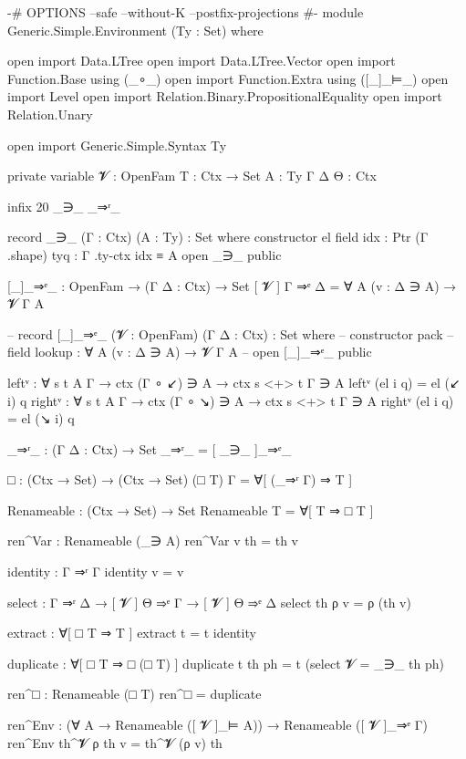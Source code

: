 \begin{code}
{-# OPTIONS --safe --without-K --postfix-projections #-}
module Generic.Simple.Environment (Ty : Set) where

  open import Data.LTree
  open import Data.LTree.Vector
  open import Function.Base using (_∘_)
  open import Function.Extra using ([_]_⊨_)
  open import Level
  open import Relation.Binary.PropositionalEquality
  open import Relation.Unary

  open import Generic.Simple.Syntax Ty

  private
    variable
      𝓥 : OpenFam
      T : Ctx → Set
      A : Ty
      Γ Δ Θ : Ctx

  infix 20 _∋_ _⇒ʳ_

  record _∋_ (Γ : Ctx) (A : Ty) : Set where
    constructor el
    field
      idx : Ptr (Γ .shape)
      tyq : Γ .ty-ctx idx ≡ A
  open _∋_ public

  [_]_⇒ᵉ_ : OpenFam → (Γ Δ : Ctx) → Set
  [ 𝓥 ] Γ ⇒ᵉ Δ = ∀ {A} (v : Δ ∋ A) → 𝓥 Γ A

  -- record [_]_⇒ᵉ_ (𝓥 : OpenFam) (Γ Δ : Ctx) : Set where
  --   constructor pack
  --   field lookup : ∀ {A} (v : Δ ∋ A) → 𝓥 Γ A
  -- open [_]_⇒ᵉ_ public

  leftᵛ : ∀ {s t A Γ} → ctx (Γ ∘ ↙) ∋ A → ctx {s <+> t} Γ ∋ A
  leftᵛ (el i q) = el (↙ i) q
  rightᵛ : ∀ {s t A Γ} → ctx (Γ ∘ ↘) ∋ A → ctx {s <+> t} Γ ∋ A
  rightᵛ (el i q) = el (↘ i) q

  _⇒ʳ_ : (Γ Δ : Ctx) → Set
  _⇒ʳ_ = [ _∋_ ]_⇒ᵉ_

  □ : (Ctx → Set) → (Ctx → Set)
  (□ T) Γ = ∀[ (_⇒ʳ Γ) ⇒ T ]

  Renameable : (Ctx → Set) → Set
  Renameable T = ∀[ T ⇒ □ T ]

  ren^Var : Renameable (_∋ A)
  ren^Var v th = th v

  identity : Γ ⇒ʳ Γ
  identity v = v

  select : Γ ⇒ʳ Δ → [ 𝓥 ] Θ ⇒ᵉ Γ → [ 𝓥 ] Θ ⇒ᵉ Δ
  select th ρ v = ρ (th v)

  extract : ∀[ □ T ⇒ T ]
  extract t = t identity

  duplicate : ∀[ □ T ⇒ □ (□ T) ]
  duplicate t th ph = t (select {𝓥 = _∋_} th ph)

  ren^□ : Renameable (□ T)
  ren^□ = duplicate

  ren^Env : (∀ {A} → Renameable ([ 𝓥 ]_⊨ A)) → Renameable ([ 𝓥 ]_⇒ᵉ Γ)
  ren^Env th^𝓥 ρ th v = th^𝓥 (ρ v) th
\end{code}
